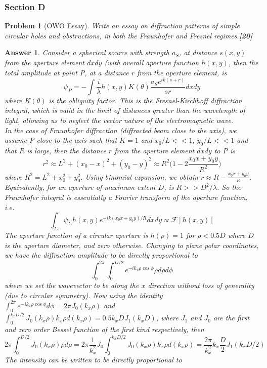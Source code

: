 \documentclass[a4paper]{article}
\newtheorem{ans}{Answer}[subsection]
\theoremstyle{new}
\newtheorem{qns}{Problem}[subsection]
\begin{document}
\subsubsection{Section D}
\begin{qns}[OWO Essay]
Write an essay on diffraction patterns of simple circular holes and obstructions, in both the Fraunhofer and Fresnel regimes.\hfill\textbf{[20]}
\end{qns}
\begin{ans}
Consider a spherical source with strength $a_S$, at distance $s(x,y)$ from the aperture element $dxdy$ (with overall aperture function $h(x,y)$, then the total amplitude at point P, at a distance $r$ from the aperture element, is
$$\psi_P=-\int\frac{i}{\lambda}h(x,y)K(\theta)\frac{a_Se^{ik(s+r)}}{sr}dxdy$$
where $K(\theta)$ is the obliquity factor. This is the Fresnel-Kirchhoff diffraction integral, which is valid in the limit of distances greater than the wavelength of light, allowing us to neglect the vector nature of the electromagnetic wave.\\[5pt]
In the case of Fraunhofer diffraction (diffracted beam close to the axis), we assume P close to the axis such that $K=1$ and $x_0/L<<1$, $y_0/L<<1$ and that $R$ is large, then the distance $r$ from the aperture element $dxdy$ to P is
$$r^2\approx L^2+(x_0-x)^2+(y_0-y)^2\approx R^2\bigg(1-2\frac{x_0x+y_0y}{R^2}\bigg)$$
where $R^2=L^2+x_0^2+y_0^2$. Using binomial expansion, we obtain $r\approx R-\frac{x_0x+y_0y}{R}$. Equivalently, for an aperture of maximum extent $D$, is $R>>D^2/\lambda$. So the Fraunhofer integral is essentially a Fourier transform of the aperture function, i.e.
$$\int_\Sigma\psi_\Sigma h(x,y)e^{-ik(x_0x+y_0y)/R}dxdy\propto\mathcal{F}[h(x,y)]$$
The aperture function of a circular aperture is $h(\rho)=1$ for $\rho<0.5D$ where $D$ is the aperture diameter, and zero otherwise. 
Changing to plane polar coordinates, we have the diffraction amplitude to be directly proportional to
$$\int_0^{2\pi}\int_0^{D/2}e^{-ik_x\rho\cos\phi}\rho d\rho d\phi$$
where we set the wavevector to be along the $x$ direction without loss of generality (due to circular symmetry). Now using the identity $\int_0^{2\pi}e^{-ik_x\rho\cos\phi}d\phi=2\pi J_0(k_x\rho)$ and $\int_0^{k_xD/2}J_0(k_x\rho)k_x\rho d(k_x\rho)=0.5k_xDJ_1(k_xD)$, where $J_1$ and $J_0$ are the first and zero order Bessel function of the first kind respectively, then 
$$2\pi\int_0^{D/2}J_0(k_x\rho)\rho d\rho=2\pi\frac{1}{k_x^2}J_0\int_0^{k_xD/2}J_0(k_x\rho)k_x\rho d(k_x\rho)=\frac{2\pi}{k_x^2}k_x\frac{D}{2}J_1(k_xD/2)$$
The intensity can be written to be directly proportional to 

\end{ans}
\end{document}

